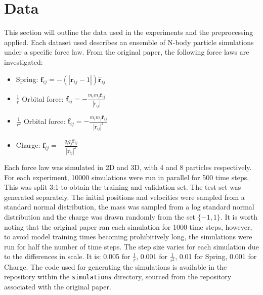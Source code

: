 \documentclass[11pt]{article}
\begin{document}
\section{Data}
This section will outline the data used in the experiments and the preprocessing applied. Each dataset used describes an ensemble of N-body particle simulations under a specific force law. From the original paper, the following force laws are investigated:
\begin{itemize}
    \item Spring: \(\textbf{f}_{ij} = -(|\textbf{r}_{ij} - 1|) \hat{\textbf{r}}_{ij}\)
    \item \(\frac{1}{r}\) Orbital force: \(\textbf{f}_{ij} = -\frac{m_i m_j\hat{\textbf{r}}_{ij}}{|\textbf{r}_{ij}|}\)
    \item \(\frac{1}{r^2}\) Orbital force: \(\textbf{f}_{ij} = -\frac{m_i m_j \hat{\textbf{r}}_{ij}}{|\textbf{r}_{ij}|^2}\)
    \item Charge: \(\textbf{f}_{ij} = -\frac{q_i q_j \hat{\textbf{r}}_{ij}}{|\textbf{r}_{ij}|^2}\)
\end{itemize}
Each force law was simulated in 2D and 3D, with 4 and 8 particles respectively. For each experiment, 10000 simulations were run in parallel for 500 time steps. This was split 3:1 to obtain the training and validation set. The test set was generated separately. The initial positions and velocities were sampled from a standard normal distribution, the mass was sampled from a log standard normal distribution and the charge was drawn randomly from the set \(\{-1, 1\}\). 
It is worth noting that the original paper ran each simulation for 1000 time steps, however, to avoid model training times becoming prohibitively long, the simulations were run for half the number of time steps. The step size varies for each simulation due to the differences in scale. It is: 0.005 for \( \frac{1}{r} \), 0.001 for \( \frac{1}{r^2} \), 0.01 for Spring, 0.001 for Charge. The code used for generating the simulations is available in the repository within the \texttt{simulations} directory, sourced from the repository associated with the original paper.
\end{document}
